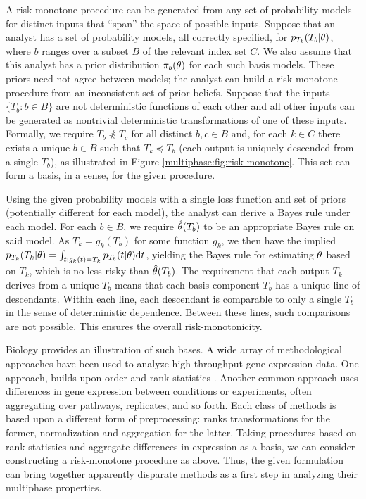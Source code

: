 A risk monotone procedure can be generated from any set of probability models for distinct inputs that ``span'' the space of possible inputs.
Suppose that an analyst has a set of probability models, all correctly specified, for $p_{T_b}(T_b | \theta)$, where $b$ ranges over a subset $B$ of the relevant index set $C$.
We also assume that this analyst has a prior distribution $\pi_b(\theta)$ for each such basis models.
These priors need not agree between models; the analyst can build a risk-monotone procedure from an inconsistent set of prior beliefs.
Suppose that the inputs $\{T_b : b \in B\}$ are not deterministic functions of each other and all other inputs can be generated as nontrivial deterministic transformations of one of these inputs.
Formally, we require $T_b \not \preceq T_c$ for all distinct $b, c \in B$ and, for each $k \in C$ there exists a unique $b \in B$ such that $T_k \preceq T_b$ (each output is uniquely descended from a single $T_b$),
as illustrated  in Figure \ref{multiphase:fig:risk-monotone}.
This set can form a basis, in a sense, for the given procedure.

Using the given probability models with a single loss function and set of priors (potentially different for each model), the analyst can derive a Bayes rule under each model.
For each $b \in B$, we require $\hat{\theta}(T_b)$ to be an appropriate Bayes rule on said model.
As $T_k = g_k(T_b)$ for some function $g_k$, we then have the implied $p_{T_k}(T_k | \theta) = \int_{t : g_k(t) = T_k} p_{T_b}(t | \theta) \mathrm{d} t$, yielding the Bayes rule for estimating $\theta$  based on $T_k$, which is no less risky than $\hat{\theta}(T_b)$.
The requirement that each output $T_k$ derives from a unique $T_b$ means that each basis component $T_b$ has a unique line of descendants.
Within each line, each descendant is comparable to only a single $T_b$ in the sense of deterministic dependence.
Between these lines, such comparisons are not possible.
This ensures  the overall risk-monotonicity.

Biology provides an illustration of such bases.
A wide array of methodological approaches have been used to analyze high-throughput gene expression data.
One approach, builds upon order and rank statistics \citep{Geman2004,Tan2005,Geman2012}.
Another common approach uses differences in gene expression between conditions or experiments, often aggregating over pathways, replicates, and so forth.
Each class of methods is based upon a different form of preprocessing: ranks transformations for the former, normalization and aggregation for the latter.
Taking procedures based on rank statistics and aggregate differences in expression as a basis, we can consider constructing a risk-monotone procedure as above.
Thus, the given formulation can bring together apparently disparate methods as a first step in analyzing their multiphase properties.

